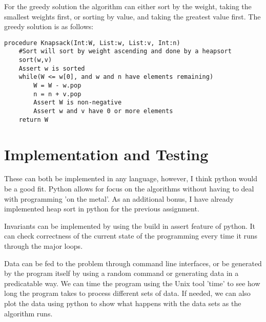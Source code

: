 \documentclass{article}
\begin{document}
For the greedy solution the algorithm can either sort by the weight, taking the
smallest weights first, or sorting by value, and taking the greatest value 
first. The greedy solution is as follows:


\begin{lstlisting}
procedure Knapsack(Int:W, List:w, List:v, Int:n)
	#Sort will sort by weight ascending and done by a heapsort
	sort(w,v)
	Assert w is sorted
	while(W <= w[0], and w and n have elements remaining)
		W = W - w.pop
		n = n + v.pop
		Assert W is non-negative
		Assert w and v have 0 or more elements
	return W
\end{lstlisting}

\section{Implementation and Testing}
These can both be implemented in any language, however, I think python would be
a good fit. Python allows for focus on the algorithms without having to deal
with programming 'on the metal'. As an additional bonus, I have already
implemented heap sort in python for the previous assignment.

Invariants can be implemented by using the build in assert feature of python.
It can check correctness of the current state of the programming every time it
runs through the major loops.

Data can be fed to the problem through command line interfaces, or be generated
by the program itself by using a random command or generating data in a
predicatable way. We can time the program using the Unix tool 'time' to see
how long the program takes to process different sets of data. If needed, we can
also plot the data using python to show what happens with the data sets as the
algorithm runs.
\end{document}
